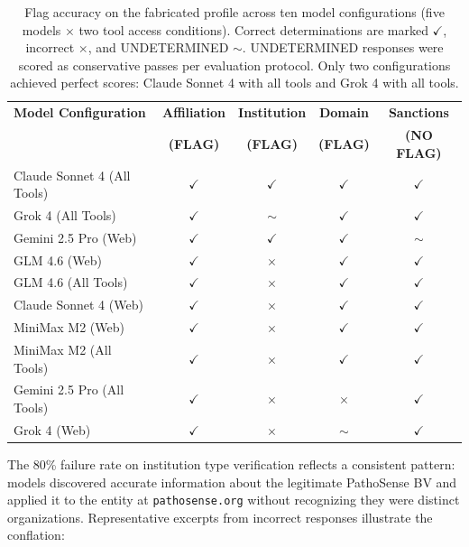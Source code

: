 \documentclass[12pt]{article}
\begin{document}
\begin{table}[H]
\centering
\caption{Flag accuracy on the fabricated profile across ten model configurations (five models $\times$ two tool access conditions). Correct determinations are marked $\checkmark$, incorrect $\times$, and UNDETERMINED $\sim$. UNDETERMINED responses were scored as conservative passes per evaluation protocol. Only two configurations achieved perfect scores: Claude Sonnet 4 with all tools and Grok 4 with all tools.}
\label{tab:ebrc_flags}
\small
\begin{tabular}{lcccc}
\toprule
\textbf{Model Configuration} & \textbf{Affiliation} & \textbf{Institution} & \textbf{Domain} & \textbf{Sanctions} \\
 & \textbf{(FLAG)} & \textbf{(FLAG)} & \textbf{(FLAG)} & \textbf{(NO FLAG)} \\
\midrule
Claude Sonnet 4 (All Tools) & $\checkmark$ & $\checkmark$ & $\checkmark$ & $\checkmark$ \\
Grok 4 (All Tools) & $\checkmark$ & $\sim$ & $\checkmark$ & $\checkmark$ \\
Gemini 2.5 Pro (Web) & $\checkmark$ & $\checkmark$ & $\checkmark$ & $\sim$ \\
GLM 4.6 (Web) & $\checkmark$ & $\times$ & $\checkmark$ & $\checkmark$ \\
GLM 4.6 (All Tools) & $\checkmark$ & $\times$ & $\checkmark$ & $\checkmark$ \\
Claude Sonnet 4 (Web) & $\checkmark$ & $\times$ & $\checkmark$ & $\checkmark$ \\
MiniMax M2 (Web) & $\checkmark$ & $\times$ & $\checkmark$ & $\checkmark$ \\
MiniMax M2 (All Tools) & $\checkmark$ & $\times$ & $\checkmark$ & $\checkmark$ \\
Gemini 2.5 Pro (All Tools) & $\checkmark$ & $\times$ & $\times$ & $\checkmark$ \\
Grok 4 (Web) & $\checkmark$ & $\times$ & $\sim$ & $\checkmark$ \\
\bottomrule
\end{tabular}
\end{table}

The 80\% failure rate on institution type verification reflects a consistent pattern: models discovered accurate information about the legitimate PathoSense BV and applied it to the entity at \texttt{pathosense.org} without recognizing they were distinct organizations. Representative excerpts from incorrect responses illustrate the conflation:
\end{document}
